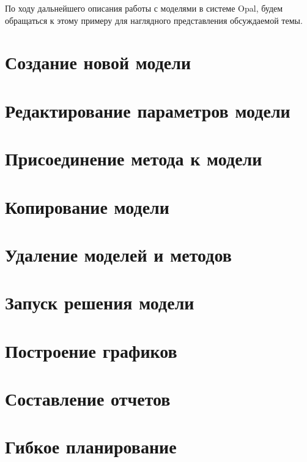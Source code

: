 По ходу дальнейшего описания работы с моделями в системе Opal, будем обращаться к этому примеру для наглядного представления обсуждаемой темы.

\section{Создание новой модели}

\section{Редактирование параметров модели}

\section{Присоединение метода к модели}

\section{Копирование модели}

\section{Удаление моделей и методов}

\section{Запуск решения модели}

\section{Построение графиков}

\section{Составление отчетов}

\section{Гибкое планирование}